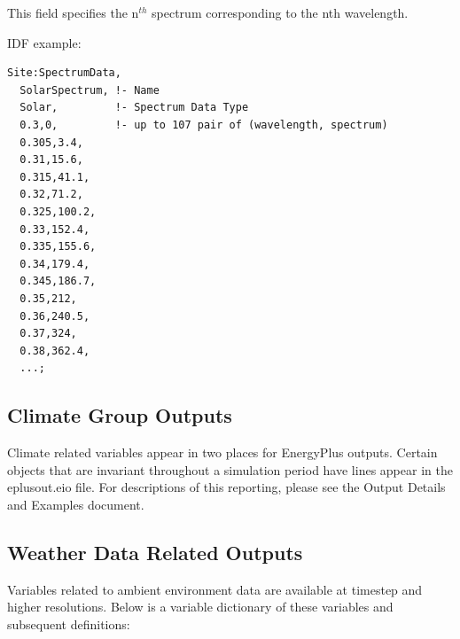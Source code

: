 This field specifies the n$^{th}$ spectrum corresponding to the nth wavelength.

IDF example:

\begin{lstlisting}
Site:SpectrumData,
  SolarSpectrum, !- Name
  Solar,         !- Spectrum Data Type
  0.3,0,         !- up to 107 pair of (wavelength, spectrum)
  0.305,3.4,
  0.31,15.6,
  0.315,41.1,
  0.32,71.2,
  0.325,100.2,
  0.33,152.4,
  0.335,155.6,
  0.34,179.4,
  0.345,186.7,
  0.35,212,
  0.36,240.5,
  0.37,324,
  0.38,362.4,
  ...;
\end{lstlisting}

\subsection{Climate Group Outputs}\label{outputs-3-011}

Climate related variables appear in two places for EnergyPlus outputs. Certain objects that are invariant throughout a simulation period have lines appear in the eplusout.eio file. For descriptions of this reporting, please see the Output Details and Examples document.

\subsection{Weather Data Related Outputs}\label{outputs-4-008}

Variables related to ambient environment data are available at timestep and higher resolutions. Below is a variable dictionary of these variables and subsequent definitions:

